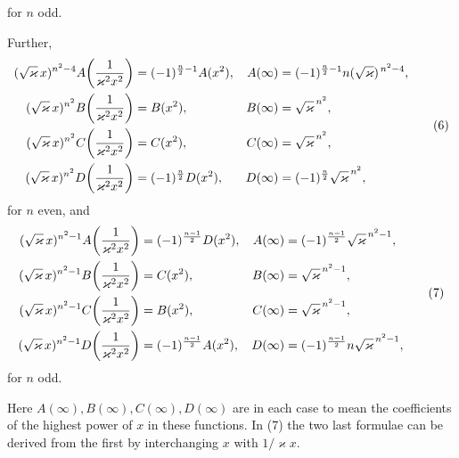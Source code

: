 \documentclass[11pt]{article}
\begin{document}
for $n$ odd.

Further,
\begin{equation}
\begin{aligned}
(\sqrt{\varkappa}\,x)^{n^2-4}A\!\left({1\over\varkappa^2x^2}\right)
&=(-1)^{\frac n2-1}A(x^2),&
A(\infty)&=(-1)^{\frac n2-1}n(\sqrt{\varkappa})^{\,n^2-4},\\
(\sqrt{\varkappa}\,x)^{n^2}B\!\left({1\over\varkappa^2x^2}\right)
&=B(x^2),&
B(\infty)&=\sqrt{\varkappa}^{\,n^2},\\
(\sqrt{\varkappa}\,x)^{n^2}C\!\left({1\over\varkappa^2x^2}\right)
&=C(x^2),&
C(\infty)&=\sqrt{\varkappa}^{\,n^2},\\
(\sqrt{\varkappa}\,x)^{n^2}D\!\left({1\over\varkappa^2x^2}\right)
&=(-1)^{\frac n2}D(x^2),&
D(\infty)&=(-1)^{\frac n2}\sqrt{\varkappa}^{\,n^2},
\end{aligned}
\tag{6}
\end{equation}
for $n$ even, and
\begin{equation}
\begin{aligned}
(\sqrt{\varkappa}\,x)^{n^2-1}A\!\left({1\over\varkappa^2x^2}\right)
&=(-1)^{\frac{n-1}{2}}D(x^2),&
A(\infty)&=(-1)^{\frac{n-1}{2}}\sqrt{\varkappa}^{\,n^2-1},\\
(\sqrt{\varkappa}\,x)^{n^2-1}B\!\left({1\over\varkappa^2x^2}\right)
&=C(x^2),&
B(\infty)&=\sqrt{\varkappa}^{\,n^2-1},\\
(\sqrt{\varkappa}\,x)^{n^2-1}C\!\left({1\over\varkappa^2x^2}\right)
&=B(x^2),&
C(\infty)&=\sqrt{\varkappa}^{\,n^2-1},\\
(\sqrt{\varkappa}\,x)^{n^2-1}D\!\left({1\over\varkappa^2x^2}\right)
&=(-1)^{\frac{n-1}{2}}A(x^2),&
D(\infty)&=(-1)^{\frac{n-1}{2}}n\sqrt{\varkappa}^{\,n^2-1},
\end{aligned}
\tag{7}
\end{equation}
for $n$ odd.

Here $A(\infty),B(\infty),C(\infty),D(\infty)$ are in each case to mean the coefficients
of the highest power of $x$ in these functions. In (7) the two last formulae can be derived
from the first by interchanging $x$ with $1/\varkappa x$.
\end{document}

